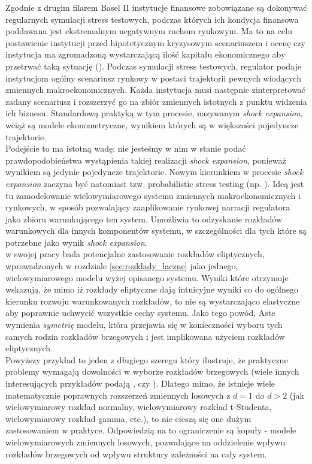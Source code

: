 Zgodnie z drugim filarem Basel II instytucje finansowe zobowiązane są dokonywać regularnych symulacji stress testowych, podczas których ich kondycja finansowa poddawana jest ekstremalnym negatywnym ruchom rynkowym. Ma to na celu postawienie instytucji przed hipotetycznym kryzysowym scenariuszem i ocenę czy instytucja ma zgromadzoną wystarczającą ilość kapitału ekonomicznego aby przetrwać taką sytuację (\cite{BaselII}). Podczas symulacji stress testowych, regulator podaje instytucjom ogólny scenariusz rynkowy w postaci trajektorii pewnych wiodących zmiennych makroekonomicznych. Każda instytucja musi następnie zinterpretować zadany scenariusz i rozszerzyć go na zbiór zmiennych istotnych z punktu widzenia ich biznesu. Standardową praktyką w tym procesie, nazywanym \emph{shock expansion}, wciąż są modele ekonometryczne, wynikiem których są w większości pojedyncze trajektorie. \cite{Siddique_Stress_testing}\\
Podejście to ma istotną wadę: nie jesteśmy w nim w stanie podać prawdopodobieństwa wystąpienia takiej realizacji \emph{shock expansion}, ponieważ wynikiem są jedynie pojedyncze trajektorie. Nowym kierunkiem w procesie \textit{shock expansion} zaczyna być natomiast tzw. probabilistic stress testing (np. \cite{Aste_Probabilistic_Stress_Testing}). Ideą jest tu zamodelowanie wielowymiarowego systemu zmiennych makroekonomicznych i rynkowych, w sposób pozwalający zaaplikowanie rynkowej narracji regulatora jako zbioru warunkującego ten system. Umożliwia to odzyskanie rozkładów warunkowych dla innych komponentów systemu, w szczególności dla tych które są potrzebne jako wynik \emph{shock expansion}.\\
\cite{Aste_Probabilistic_Stress_Testing} w swojej pracy bada potencjalne zastosowanie rozkładów eliptycznych, wprowadzonych w rozdziale \ref{sec:rozklady_laczne} jako jednego, wielowymiarowego modelu wyżej opisanego systemu. Wyniki które otrzymuje wskazują, że mimo iż rozkłady eliptyczne dają intuicyjne wyniki co do ogólnego kierunku rozwoju warunkowanych rozkładów, to nie są wystarczająco elastyczne aby poprawnie uchwycić wszystkie cechy systemu. Jako tego powód, Aste wymienia \textit{symetrię} modelu, która przejawia się w konieczności wyboru tych samych rodzin rozkładów brzegowych i jest implikowana użyciem rozkładów eliptycznych.\\

Powyższy przykład to jeden z długiego szeregu który ilustruje, że praktyczne problemy wymagają dowolności w wyborze rozkładów brzegowych (wiele innych interesujących przykładów podają \cite{Cherubini_Copula_Methods_in_Finance}, czy \cite{Cherubini_Dynamic_Copula_Methods_in_Finance}). Dlatego mimo, że istnieje wiele matematycznie poprawnych rozszerzeń zmiennych losowych z $d=1$ do $d>2$ (jak wielowymiarowy rozkład normalny, wielowymiarowy rozkład t-Studenta, wielowymiarowy rozkład gamma, etc.), to nie cieszą się one dużym zastosowaniem w praktyce. Odpowiedzią na to ograniczenie są kopuły - modele wielowymiarowych zmiennych losowych, pozwalające na oddzielenie wpływu rozkładów brzegowych od wpływu struktury zależności na cały system.\\